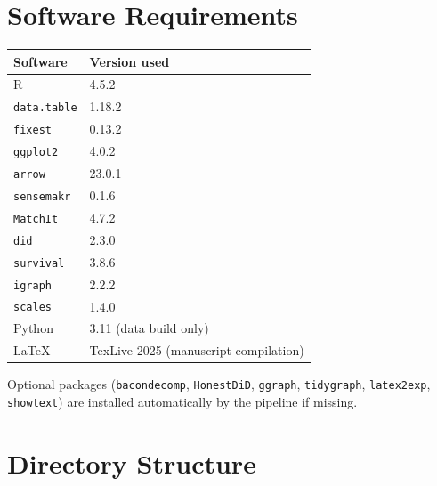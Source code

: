 \documentclass[11pt]{article}
\begin{document}
\section{Software Requirements}

\begin{table}[h]
\centering
\small
\begin{tabular}{ll}
\toprule
Software & Version used \\
\midrule
R & 4.5.2 \\
\texttt{data.table} & 1.18.2 \\
\texttt{fixest} & 0.13.2 \\
\texttt{ggplot2} & 4.0.2 \\
\texttt{arrow} & 23.0.1 \\
\texttt{sensemakr} & 0.1.6 \\
\texttt{MatchIt} & 4.7.2 \\
\texttt{did} & 2.3.0 \\
\texttt{survival} & 3.8.6 \\
\texttt{igraph} & 2.2.2 \\
\texttt{scales} & 1.4.0 \\
Python & 3.11 (data build only) \\
\LaTeX & TexLive 2025 (manuscript compilation) \\
\bottomrule
\end{tabular}
\end{table}

\noindent Optional packages (\texttt{bacondecomp}, \texttt{HonestDiD},
\texttt{ggraph}, \texttt{tidygraph}, \texttt{latex2exp},
\texttt{showtext}) are installed automatically by the pipeline if
missing.

\section{Directory Structure}
\end{document}

